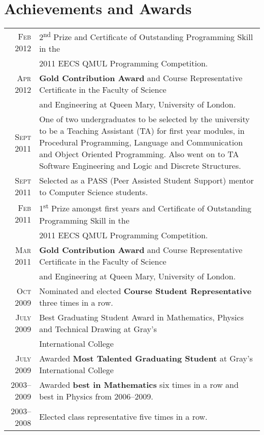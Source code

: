 \documentclass[a4paper,10pt]{article}
\begin{document}
\section{Achievements and Awards}
\begin{tabular}{rl}
  \textsc{Feb} 2012 & 2\textsuperscript{nd}  Prize and Certificate of Outstanding Programming Skill in the\\& 2011 EECS
  QMUL Programming Competition.\\

  \textsc{Apr} 2012 & \textbf{Gold Contribution Award} and Course Representative Certificate in the
  Faculty of Science\\& and Engineering at Queen Mary, University of London.\\

  \textsc{Sept} 2011 & One of two undergraduates to be selected by the university to be a Teaching
  Assistant (TA) for first year modules, in Procedural Programming, Language and Communication and
  Object Oriented Programming. Also went on to TA Software Engineering and Logic and Discrete
  Structures.\\

  \textsc{Sept} 2011 & Selected as a PASS (Peer Assisted Student Support) mentor to Computer Science
  students.\\

  \textsc{Feb} 2011 & 1\textsuperscript{st} Prize amongst first years and Certificate of Outstanding Programming
  Skill in the\\& 2011 EECS QMUL Programming Competition.\\

  \textsc{Mar} 2011 & \textbf{Gold Contribution Award} and Course Representative Certificate in the
  Faculty of Science\\& and Engineering at Queen Mary, University of London.\\

  \textsc{Oct} 2009 & Nominated and elected \textbf{Course Student Representative} three times in a
  row.\\

  \textsc{July} 2009 & Best Graduating Student Award in Mathematics, Physics and Technical Drawing
  at Gray’s\\& International College\\

  \textsc{July} 2009 & Awarded \textbf{Most Talented Graduating Student} at Gray’s International
  College\\

  \textsc{2003--2009} & Awarded \textbf{best in Mathematics} six times in a row and best in Physics
  from 2006--2009.\\

  \textsc{2003--2008} & Elected class representative five times in a row.
\end{tabular}
\end{document}
